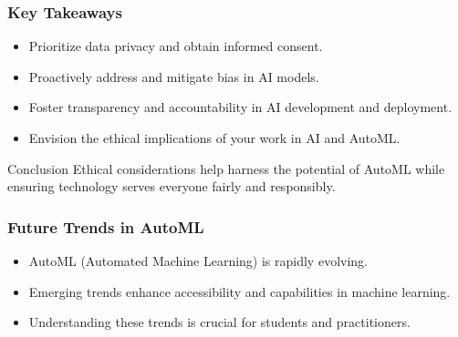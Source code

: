 \documentclass[aspectratio=169]{beamer}
\begin{document}
\begin{frame}[fragile]
    \frametitle{Key Takeaways}
    \begin{itemize}
        \item Prioritize data privacy and obtain informed consent.
        \item Proactively address and mitigate bias in AI models.
        \item Foster transparency and accountability in AI development and deployment.
        \item Envision the ethical implications of your work in AI and AutoML.
    \end{itemize}
    
    \begin{block}{Conclusion}
        Ethical considerations help harness the potential of AutoML while ensuring technology serves everyone fairly and responsibly.
    \end{block}
\end{frame}

\begin{frame}[fragile]
  \frametitle{Future Trends in AutoML}
  \begin{itemize}
    \item AutoML (Automated Machine Learning) is rapidly evolving.
    \item Emerging trends enhance accessibility and capabilities in machine learning.
    \item Understanding these trends is crucial for students and practitioners.
  \end{itemize}
\end{frame}
\end{document}
